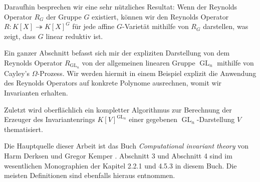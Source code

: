 Daraufhin besprechen wir eine sehr n\"utzliches Resultat:  Wenn der Reynolds Operator $R_G$ der Gruppe $G$ existiert, k\"onnen wir den Reynolds Operator $R \colon K[X] \twoheadrightarrow K[X]^G$ f\"ur jede affine $G$-Variet\"at mithilfe von $R_G$ darstellen, was zeigt, dass $G$ linear reduktiv ist.

Ein ganzer Abschnitt befasst sich mir der expliziten Darstellung von dem Reynolds Operator $R_{\operatorname{GL}_n}$ von der allgemeinen linearen Gruppe $\operatorname{GL}_n$ mithilfe von Cayley's $\Omega$-Prozess.
Wir werden hiermit in einem Beispiel explizit die Anwendung des Reynolds Operators auf konkrete Polynome ausrechnen, womit wir Invarianten erhalten.

Zuletzt wird oberfl\"achlich ein kompletter Algorithmus zur Berechnung der Erzeuger des Invariantenrings $K[V]^{\operatorname{GL}_n}$ einer gegebenen $\operatorname{GL}_n$-Darstellung $V$ thematisiert.
\vspace{0.3cm}

Die Hauptquelle dieser Arbeit ist das Buch \textit{Computational invariant theory} von Harm Derksen und Gregor Kemper \cite{DK15}.
Abschnitt 3 und Abschnitt 4 sind im wesentlichen Monographien der Kapitel 2.2.1 und 4.5.3 in diesem Buch.
Die meisten Definitionen sind ebenfalls hieraus entnommen.


